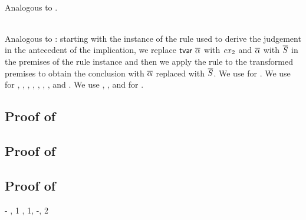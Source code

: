 \begin{bycase}
\Case{\Rthif}\\
Analogous to \Reif.

\Case{\restrules}\\
Analogous to \Rtbool: starting with the instance of the rule used to derive
the judgement in the antecedent of the implication, we replace
$\mathsf{tvar}\ \overline{\alpha}$ with $\mathit{cx}_2$ and $\overline{\alpha}$ with $\overline{S}$ in the premises of
the rule instance and then we apply the rule to the transformed premises to
obtain the conclusion with $\overline{\alpha}$ replaced with $\overline{S}$. We use
 for \Rtsub. We use 
for \Rstrefl, \Rstarr, \Rstrec, \Redesc, \Rthbool, \Rthext, \Rthrec, and
\Rthprojsub. We use ,
, and  for
\Reabsalpha.

\end{bycase}



\subsection*{Proof of }

\begin{derivation}
\step{\istyO{\typ}}{\hyp}
\step{\var\not\in\cxvarO}{\hyp}
\end{derivation}



\subsection*{Proof of }

\begin{derivation}
\step{\istyO{\typ}}{\hyp}
\end{derivation}



\subsection*{Proof of }

\begin{derivation}
\step{\cxwfO}
     {\hyp}
\step{\istyO{\bool}}
     {\Rtbool, 1}
\step{\cxwf{\snoc{\cx}{\vdec{\var}{\bool}}}}
     {\Rcxvdec, 1, \hyp, 2}
\end{derivation}



